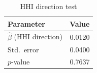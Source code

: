 \begin{table}[htbp]
\centering
\caption{HHI direction test}
\label{tab:direction_test}
\begin{tabular}{lr}
\toprule
\textbf{Parameter} & \textbf{Value} \\
\midrule
$\hat{\beta}$ (HHI direction) & 0.0120 \\
Std.\ error & 0.0400 \\
$p$-value & 0.7637 \\
\bottomrule
\end{tabular}
\end{table}
